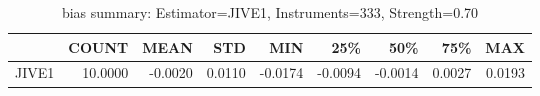 \begin{table}[ht]
\centering
\caption{bias summary: Estimator=JIVE1, Instruments=333, Strength=0.70}
\begin{tabular}{lrrrrrrrr}
\toprule
 & COUNT & MEAN & STD & MIN & 25\% & 50\% & 75\% & MAX \\
\midrule
JIVE1 & 10.0000 & -0.0020 & 0.0110 & -0.0174 & -0.0094 & -0.0014 & 0.0027 & 0.0193 \\
\bottomrule
\end{tabular}
\end{table}
